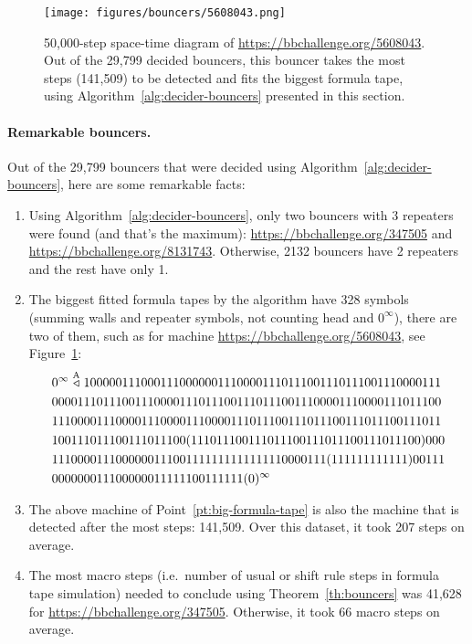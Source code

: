 \begin{figure}[h!]
    \centering
    \texttt{[image: figures/bouncers/5608043.png]}
    \caption{\small 50,000-step space-time diagram of \url{https://bbchallenge.org/5608043}. Out of the 29,799 decided bouncers, this bouncer takes the most steps (141,509) to be detected and fits the biggest formula tape, using Algorithm~\ref{alg:decider-bouncers} presented in this section.}\label{fig:big-bounce}
\end{figure}
\vspace{-2.5ex}
\paragraph*{Remarkable bouncers.} Out of the 29,799 bouncers that were decided using Algorithm~\ref{alg:decider-bouncers}, here are some remarkable facts:
\begin{enumerate}
    \item Using Algorithm~\ref{alg:decider-bouncers}, only two bouncers with 3 repeaters were found (and that's the maximum): \url{https://bbchallenge.org/347505} and \url{https://bbchallenge.org/8131743}. Otherwise, 2132 bouncers have 2 repeaters and the rest have only 1.
    \item\label{pt:big-formula-tape} The biggest fitted formula tapes by the algorithm have 328 symbols (summing walls and repeater symbols, not counting head and $0^\infty$), there are two of them, such as for machine \url{https://bbchallenge.org/5608043}, see Figure~\ref{fig:big-bounce}:
          \begin{align*}
               & 0^\infty\stackrel{\text{A}}\triangleleft  10000011100011100000011100001110111001110111001110000111 \\ &0000111011100111000011101110011101110011100001110000111011100\\ &1110000111000011100001110000111011100111011100111011100111011\\ &100111011100111011100(111011100111011100111011100111011100)000\\ &1110000111000000111001111111111111110000111(111111111111)00111\\ &000000011100000011111100111111(0)^\infty
          \end{align*}

    \item The above machine of Point~\ref{pt:big-formula-tape} is also the machine that is detected after the most steps: 141,509. Over this dataset, it took 207 steps on average.
    \item The most macro steps (i.e.\ number of usual or shift rule steps in formula tape simulation) needed to conclude using Theorem~\ref{th:bouncers} was 41,628 for \url{https://bbchallenge.org/347505}. Otherwise, it took 66 macro steps on average.

\end{enumerate}
